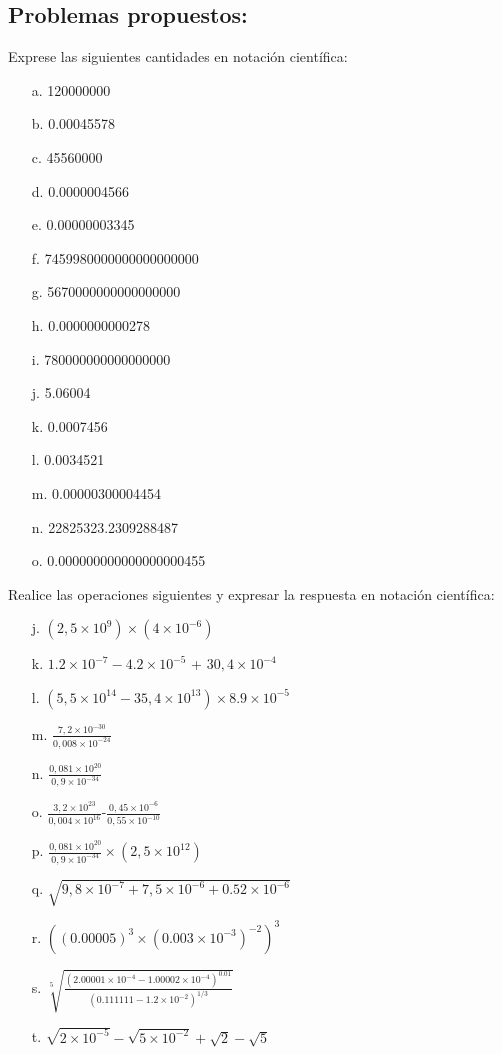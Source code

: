 \documentclass[a5paper,pagesize,10pt,bibtotoc,pointlessnumbers,
normalheadings,DIV=9,fleqn,x11names,table,twoside=false]{scrbook}
\begin{document}
\subsection{Problemas propuestos:}

Exprese las siguientes cantidades en notación científica:

\begin{itemize}
 \item[a.] 120000000
 \item[b.] 0.00045578
 \item[c.] 45560000
 \item[d.] 0.0000004566
 \item[e.] 0.00000003345
 \item[f.] 7459980000000000000000
 \item[g.] 5670000000000000000
 \item[h.] 0.0000000000278
 \item[i.] 780000000000000000
 \item[j.] 5.06004 
 \item[k.] 0.0007456
 \item[l.] 0.0034521
 \item[m.] 0.00000300004454
 \item[n.] 22825323.2309288487
 \item[o.] 0.000000000000000000455
\end{itemize}

Realice las operaciones siguientes y expresar la respuesta en notación científica:

\begin{itemize}
 \item[j.] $(2,5\times10^{9})\times(4\times10^{-6})$
 \item[k.] $1.2\times10^{-7}-4.2\times10^{-5}$ + $30,4\times10^{-4}$
 \item[l.] $(5,5\times10^{14}-35,4\times10^{13})\times 8.9\times10^{-5}$
 \item[m.] $\frac{7,2\times10^{-30}}{0,008\times10^{-24}}$
 \item[n.] $\frac{0,081\times10^{20}}{0,9\times10^{-34}}$
\item[o.]  $\frac{3,2\times10^{23}}{0,004\times10^{16}}$-$\frac{0,45\times10^{-6}}{0,55\times10^{-10}}$
\item[p.] $\frac{0,081\times10^{20}}{0,9\times10^{-34}}\times(2,5\times10^{12})$
\item[q.] $\sqrt{9,8\times10^{-7}+7,5\times10^{-6}+0.52\times 10^{-6}}$
\item[r.] $((0.00005)^3\times (0.003\times 10^{-3})^{-2})^3$
\item[s.] $\sqrt[5]{\frac{(2.00001\times 10^{-4} - 1.00002\times 10^{-4})^{0.01}}{(0.111111-1.2\times 10^{-2})^{1/3}}}$
\item[t.] $\sqrt{2\times 10^{-5}}-\sqrt{5\times 10^{-2}} + \sqrt{2} - \sqrt{5}$
\end{itemize}
\end{document}
